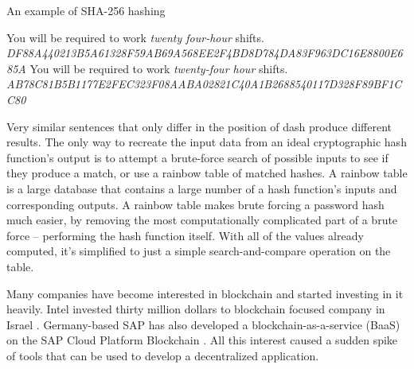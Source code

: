 An example of  SHA-256 hashing 
\begin{center}
    You will be required to work \emph{twenty four-hour} shifts.
    \textit{DF88A440213B5A61328F59AB69A568EE2F4BD8D784DA83F963DC16E8800E685A}
    You will be required to work \emph{twenty-four hour} shifts.
    \textit{AB78C81B5B1177E2FEC323F08AABA02821C40A1B2688540117D328F89BF1CC80}
\end{center}

Very similar sentences that only differ in the position of dash produce  different results. The only way to recreate the input data from an ideal cryptographic hash function's output is to attempt a brute-force search of possible inputs to see if they produce a match, or use a rainbow table of matched hashes.\cite{wiki_crypto_hash} A rainbow table is a large database that contains a large number of a hash function’s inputs and corresponding outputs. A rainbow table makes brute forcing a password hash much easier, by removing the most computationally complicated part of a brute force – performing the hash function itself. With all of the values already computed, it’s simplified to just a simple search-and-compare operation on the table.\cite{rainbow_table}

Many companies have become interested in  blockchain and started investing in it heavily. Intel invested thirty million dollars to blockchain focused company in Israel \cite{intel_israel}. Germany-based SAP has also developed a blockchain-as-a-service (BaaS) on the SAP Cloud Platform Blockchain \cite{sap}. All this interest caused a sudden spike of tools that can be used to develop a decentralized application. 














\vspace{10pt}


